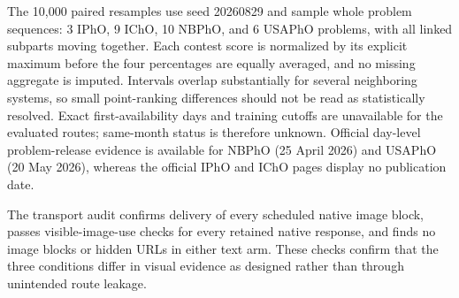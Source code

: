 \documentclass[11pt]{article}
\begin{document}
The 10,000 paired resamples use seed 20260829 and sample whole problem sequences: 3 IPhO, 9 IChO, 10 NBPhO, and 6 USAPhO problems, with all linked subparts moving together. Each contest score is normalized by its explicit maximum before the four percentages are equally averaged, and no missing aggregate is imputed. Intervals overlap substantially for several neighboring systems, so small point-ranking differences should not be read as statistically resolved. Exact first-availability days and training cutoffs are unavailable for the evaluated routes; same-month status is therefore unknown. Official day-level problem-release evidence is available for NBPhO (25 April 2026) and USAPhO (20 May 2026), whereas the official IPhO and IChO pages display no publication date.

\begin{table}[t]
\centering
\scriptsize
\setlength{\tabcolsep}{2.5pt}
\caption{Domain split of the controlled modality ablation. Arm entries are mean normalized scores in percent; $\Delta$ N--D is native image minus faithful description in percentage points, with paired-bootstrap intervals.}
\label{tab:modality-domain-split}
\end{table}

The transport audit confirms delivery of every scheduled native image block, passes visible-image-use checks for every retained native response, and finds no image blocks or hidden URLs in either text arm. These checks confirm that the three conditions differ in visual evidence as designed rather than through unintended route leakage.
\end{document}

